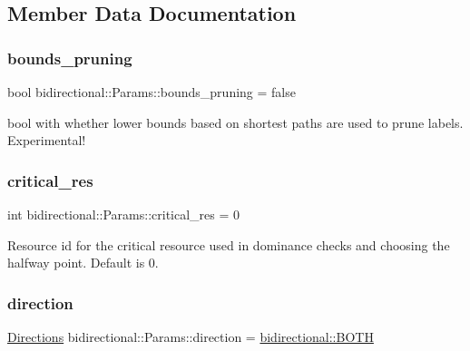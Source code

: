 \subsection{Member Data Documentation}
\mbox{\label{classbidirectional_1_1Params_a1a452cc4956571752b946165a899f850}} 
\subsubsection{\texorpdfstring{bounds\+\_\+pruning}{bounds\_pruning}}
{\footnotesize\ttfamily bool bidirectional\+::\+Params\+::bounds\+\_\+pruning = false}

bool with whether lower bounds based on shortest paths are used to prune labels. Experimental! \mbox{\label{classbidirectional_1_1Params_a7d318c4af901a82c3f566d59c6de1b62}} 
\subsubsection{\texorpdfstring{critical\+\_\+res}{critical\_res}}
{\footnotesize\ttfamily int bidirectional\+::\+Params\+::critical\+\_\+res = 0}

Resource id for the critical resource used in dominance checks and choosing the halfway point. Default is 0. \mbox{\label{classbidirectional_1_1Params_a1d461034d1a1e04fa7f00cb63cd230d8}} 
\subsubsection{\texorpdfstring{direction}{direction}}
{\footnotesize\ttfamily \hyperlink{namespacebidirectional_a4cbe6f0bfbd3629c2cd44c98014aed70}{Directions} bidirectional\+::\+Params\+::direction = \hyperlink{namespacebidirectional_a4cbe6f0bfbd3629c2cd44c98014aed70ab50b3fbd895a667b43b3e9eb3bd54f85}{bidirectional\+::\+B\+O\+TH}}



